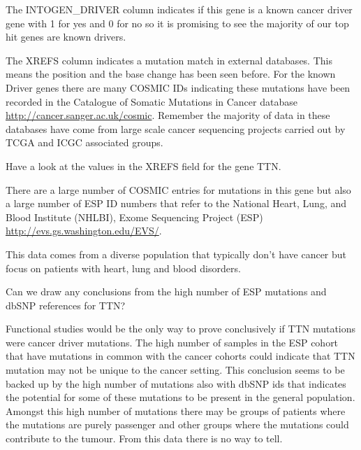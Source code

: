 \begin{information}
The INTOGEN\_DRIVER column indicates if this gene is a known cancer driver gene with 1 for yes and
0 for no so it is promising to see the majority of our top hit genes are known drivers.

The XREFS column indicates a mutation match in external databases. This means the position and
the base change has been seen before. For the known Driver genes there are many COSMIC IDs indicating
these mutations have been recorded in the Catalogue of Somatic Mutations in Cancer database
\url{http://cancer.sanger.ac.uk/cosmic}. Remember the majority of data in these databases have come from
large scale cancer sequencing projects carried out by TCGA and ICGC associated groups.
\end{information}

\begin{steps}
Have a look at the values in the XREFS field for the gene TTN.
\end{steps}

There are a large number of COSMIC entries for mutations in this gene but also a large number
of ESP ID numbers that refer to the National Heart, Lung, and Blood Institute (NHLBI),
Exome Sequencing Project (ESP) \url{http://evs.gs.washington.edu/EVS/}.

\begin{information}
This data comes from a diverse population that typically don't have cancer but focus on patients
with heart, lung and blood disorders.
\end{information}

\begin{questions}
Can we draw any conclusions from the high number of ESP mutations and dbSNP references for TTN?
\end{questions}

\begin{answer}
Functional studies would be the only way to prove conclusively if TTN mutations were cancer driver mutations.
The high number of samples in the ESP cohort that have mutations in common with the cancer cohorts
could indicate that TTN mutation may not be unique to the cancer setting. This conclusion seems to be
backed up by the high number of mutations also with dbSNP ids that indicates the potential for some of
these mutations to be present in the general population.
\vspace{4 mm]}
Amongst this high number of mutations there may be groups of patients where the mutations are purely
passenger and other groups where the mutations could contribute to the tumour.
\vspace{4 mm]}
From this data there is no way to tell.
\end{answer}

